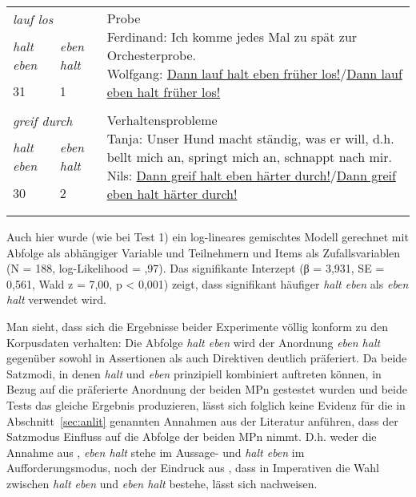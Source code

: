 \begin{table}
\begin{tabularx}{\textwidth}{llX}
\midrule
\multicolumn{2}{l}{{\textit{lauf los}}}& \multirow{3}{\hsize}{{Probe
}\newline Ferdinand: Ich komme jedes Mal zu spät zur Orchesterprobe. \newline Wolfgang: \ul{Dann lauf halt eben früher los!}/\ul{Dann lauf eben halt früher los!}}\\
\cmidrule(lr){1-2}
\emph{halt eben}& \emph{eben halt} & {}\\
\cmidrule(lr){1-2}
31 & 1 & {}\\
& & \\
\midrule
\multicolumn{2}{l}{{\textit{greif durch}}}& \multirow{3}{\hsize}{{Verhaltensprobleme
}\newline Tanja: Unser Hund macht ständig, was er will, d.h. bellt mich an, springt mich an, schnappt nach mir. \newline
Nils: \ul{Dann greif halt eben härter durch!}/\ul{Dann greif eben halt härter durch!}}\\
\cmidrule(lr){1-2}
\emph{halt eben}& \emph{eben halt} & {}\\
\cmidrule(lr){1-2}
30 & 2 & {}\\
& & \\
\lspbottomrule
\end{tabularx}
\end{table}
Auch hier wurde (wie bei Test 1) ein log-lineares gemischtes Modell gerechnet mit Abfolge als abhängiger Variable und Teilnehmern und Items als Zufallsvariablen (N = 188, log-Like\-li\-hood = ,97). Das signifikante Interzept (β = 3,931, SE = 0,561, Wald z = 7,00, p < 0,001) zeigt, dass signifikant häufiger \textit{halt eben} als \textit{eben halt} verwendet wird.

Man sieht, dass sich die Ergebnisse beider Experimente völlig konform zu den Korpusdaten verhalten: Die Abfolge \textit{halt eben} wird der Anordnung \textit{eben halt} gegenüber sowohl in Assertionen als auch Direktiven deutlich präferiert. Da beide Satzmodi, in denen \textit{halt} und \textit{eben} prinzipiell kombiniert auftreten können, in Bezug auf die präferierte Anordnung der beiden MPn gestestet wurden und beide Tests das gleiche Ergebnis produzieren, lässt sich folglich keine Evidenz für die in Abschnitt~\ref{sec:anlit} genannten Annahmen aus der Literatur anführen, dass der Satzmodus Einfluss auf die Abfolge der beiden MPn nimmt. D.h. weder die Annahme aus \citet[1542--1543]{Zifonun1997}, \textit{eben halt} stehe im Aussage- und \textit{halt eben} im Aufforderungsmodus, noch der Eindruck aus \citet[230]{Dahl1988}, dass in Imperativen die Wahl zwischen \textit{halt eben} und \textit{eben halt} bestehe, lässt sich nachweisen.

